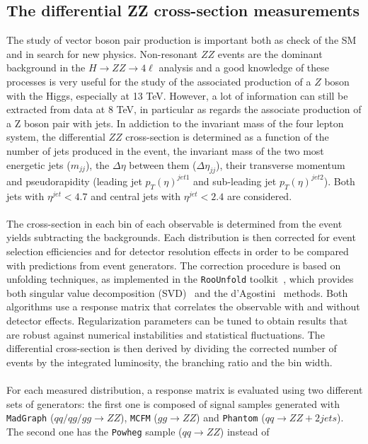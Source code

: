 \subsection{The differential ZZ cross-section measurements}
The study of vector boson pair production is important both as check of the SM and in search for new physics. 
Non-resonant $ZZ$ events are the dominant background in the $H \to ZZ \to 4\ell$ analysis and a good knowledge of 
these processes is  very useful for the study of the associated production of a $Z$ boson with the Higgs, especially at 13 TeV.
However, a lot of information
can still be extracted from data at 8 TeV, in particular as regards the associate production of a Z boson pair with jets. 
In addiction to the invariant mass of the four lepton system, the differential $ZZ$ cross-section is determined as
a function of the number of jets produced in the event, the invariant mass of the two most energetic jets ($m_{jj}$), the 
$\Delta\eta$ between them ($\Delta\eta_{jj}$), their transverse momentum and pseudorapidity (leading jet $p_{T}(\eta)^{jet1}$ and sub-leading jet $p_{T}(\eta)^{jet2}$). Both jets with  $\eta^{jet}<4.7$ and central jets with $\eta^{jet}<2.4$ are considered.\\
\\
The cross-section in each bin of each observable is determined from the event yields subtracting
the backgrounds. Each distribution is then corrected for event selection efficiencies
and for detector resolution effects in order to be compared with predictions from event generators.
The correction procedure is based on unfolding techniques, as implemented in the
\texttt{RooUnfold} toolkit~\cite{RooUnfold}, which provides both singular value decomposition (SVD)~\cite{SVD} and
the d'Agostini~\cite{DAgostini} methods. Both algorithms use a response matrix that correlates the observable
with and without detector effects. Regularization parameters can be tuned to obtain results that are robust against 
numerical instabilities and statistical fluctuations. The differential cross-section is then derived by dividing the
corrected number of events by the integrated luminosity, the branching ratio and the bin width.\\
\\
For each measured distribution, a response matrix is evaluated using two different sets of generators: the first one is composed of signal samples generated with \texttt{MadGraph} ($qq/qg/gg \to ZZ$), \texttt{MCFM} ($gg \to ZZ$) and \texttt{Phantom} ($qq \to ZZ+2jets$). The second one has the \texttt{Powheg} sample ($qq \to ZZ$) instead of
